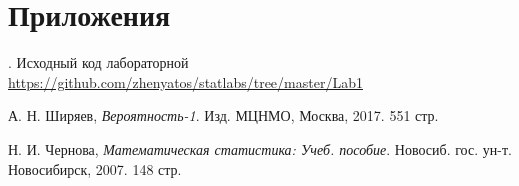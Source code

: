 \documentclass[12pt,a4paper]{article}
\begin{document}
\section{Приложения}
. Исходный код лабораторной {\url{https://github.com/zhenyatos/statlabs/tree/master/Lab1}}

\begin{thebibliography}{9} 
	 А. Н. Ширяев, \emph{Вероятность-1}. Изд. МЦНМО, Москва, 2017. 551 стр. 
	
	 Н. И. Чернова, \emph{Математическая статистика: Учеб. пособие}. Новосиб. гос. ун-т. Новосибирск, 2007. 148 стр.
\end{thebibliography}
\end{document}
